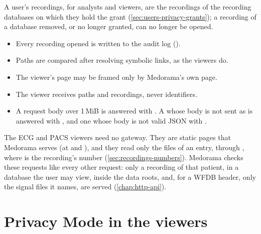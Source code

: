 A user's recordings, for analysts and viewers, are the recordings of the recording databases on
which they hold the  grant (\cref{sec:users-privacy-grants}); a recording of a
database removed, or no longer granted, can no longer be opened.

\begin{itemize}
\item Every recording opened is written to the audit log ().
\item Paths are compared after resolving symbolic links, as the viewers do.
\item The viewer's page may be framed only by Medorama's own page.
\item The viewer receives paths and recordings, never identifiers.
\item A request body over 1\,MiB is answered with . A  whose
  body is not sent as  is answered with , and one whose body is
  not valid JSON with .
\end{itemize}

The ECG and PACS viewers need no gateway. They are static pages that Medorama serves (at
 and ), and they read only the files of an entry,
through , where  is the recording's
number (\cref{sec:recordings-numbers}). Medorama checks these requests like every other request:
only a recording of that patient, in a database the user may view, inside the data roots, and,
for a WFDB header, only the signal files it names, are served (\cref{chap:http-api}).

\section{Privacy Mode in the viewers}
\label{sec:viewers-in-medorama-privacy}

